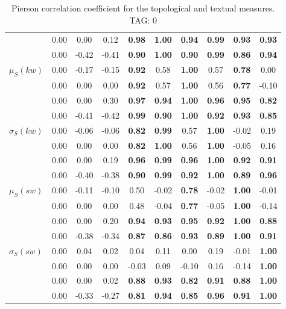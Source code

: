 \begin{table*}[h!]
\begin{center}
\begin{tabular}{| l || c | c | c | c | c | c | c | c | c |}
 & 0.00 & 0.00 & 0.12 & {\bf 0.98} & {\bf 1.00} & {\bf 0.94} & {\bf 0.99} & {\bf 0.93} & {\bf 0.93} \\
 & 0.00 & -0.42 & -0.41 & {\bf 0.90} & {\bf 1.00} & {\bf 0.90} & {\bf 0.99} & {\bf 0.86} & {\bf 0.94} \\\hline
$\mu_S(kw)$ & 0.00 & -0.17 & -0.15 & {\bf 0.92} & 0.58 & {\bf 1.00} & 0.57 & {\bf 0.78} & 0.00 \\
 & 0.00 & 0.00 & 0.00 & {\bf 0.92} & 0.57 & {\bf 1.00} & 0.56 & {\bf 0.77} & -0.10 \\
 & 0.00 & 0.00 & 0.30 & {\bf 0.97} & {\bf 0.94} & {\bf 1.00} & {\bf 0.96} & {\bf 0.95} & {\bf 0.82} \\
 & 0.00 & -0.41 & -0.42 & {\bf 0.99} & {\bf 0.90} & {\bf 1.00} & {\bf 0.92} & {\bf 0.93} & {\bf 0.85} \\\hline
$\sigma_S(kw)$ & 0.00 & -0.06 & -0.06 & {\bf 0.82} & {\bf 0.99} & 0.57 & {\bf 1.00} & -0.02 & 0.19 \\
 & 0.00 & 0.00 & 0.00 & {\bf 0.82} & {\bf 1.00} & 0.56 & {\bf 1.00} & -0.05 & 0.16 \\
 & 0.00 & 0.00 & 0.19 & {\bf 0.96} & {\bf 0.99} & {\bf 0.96} & {\bf 1.00} & {\bf 0.92} & {\bf 0.91} \\
 & 0.00 & -0.40 & -0.38 & {\bf 0.90} & {\bf 0.99} & {\bf 0.92} & {\bf 1.00} & {\bf 0.89} & {\bf 0.96} \\\hline
$\mu_S(sw)$ & 0.00 & -0.11 & -0.10 & 0.50 & -0.02 & {\bf 0.78} & -0.02 & {\bf 1.00} & -0.01 \\
 & 0.00 & 0.00 & 0.00 & 0.48 & -0.04 & {\bf 0.77} & -0.05 & {\bf 1.00} & -0.14 \\
 & 0.00 & 0.00 & 0.20 & {\bf 0.94} & {\bf 0.93} & {\bf 0.95} & {\bf 0.92} & {\bf 1.00} & {\bf 0.88} \\
 & 0.00 & -0.38 & -0.34 & {\bf 0.87} & {\bf 0.86} & {\bf 0.93} & {\bf 0.89} & {\bf 1.00} & {\bf 0.91} \\\hline
$\sigma_S(sw)$ & 0.00 & 0.04 & 0.02 & 0.04 & 0.11 & 0.00 & 0.19 & -0.01 & {\bf 1.00} \\
 & 0.00 & 0.00 & 0.00 & -0.03 & 0.09 & -0.10 & 0.16 & -0.14 & {\bf 1.00} \\
 & 0.00 & 0.00 & 0.02 & {\bf 0.88} & {\bf 0.93} & {\bf 0.82} & {\bf 0.91} & {\bf 0.88} & {\bf 1.00} \\
 & 0.00 & -0.33 & -0.27 & {\bf 0.81} & {\bf 0.94} & {\bf 0.85} & {\bf 0.96} & {\bf 0.91} & {\bf 1.00} \\\hline
\end{tabular}
\caption{Pierson correlation coefficient for the topological and textual measures. TAG: 0}
\end{center}
\end{table*}